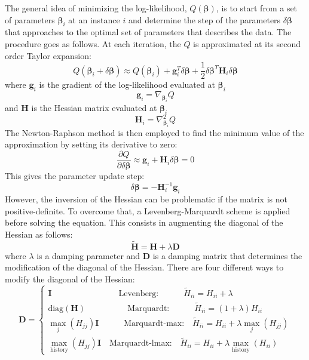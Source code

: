 The general idea of minimizing the log-likelihood, $Q(\boldsymbol{\beta})$, is to start from a set of parameters $\boldsymbol{\beta}_i$ at an instance $i$ and determine the 
step of the parameters $\delta \boldsymbol{\beta}$ that approaches to the optimal set of parameters that describes the data. 
The procedure goes as follows. At each iteration, the $Q$ is approximated at its second order Taylor expansion:
\begin{equation}
    Q( \boldsymbol{\beta}_i + \delta \boldsymbol{\beta} ) \approx 
    Q( \boldsymbol{\beta}_i) + \mathbf{g}_i^T \delta \boldsymbol{\beta} + \frac{1}{2} \delta \boldsymbol{\beta}^T \mathbf{H}_i \delta \boldsymbol{\beta}
\end{equation}
where $\mathbf{g}_i$ is the gradient of the log-likelihood evaluated at $\boldsymbol{\beta}_i$
\begin{equation}
    \mathbf{g}_i = \nabla_{\boldsymbol{\beta}_i} Q
\end{equation}
and $\mathbf{H}$ is the Hessian matrix evaluated at $\boldsymbol{\beta}_i$
\begin{equation}
    \mathbf{H}_i = \nabla_{\boldsymbol{\beta}_i}^2 Q
\end{equation}
The Newton-Raphson method is then employed to find the minimum value of the approximation by setting its derivative to zero:
\begin{equation}
    \frac{\partial Q}{\partial \delta \boldsymbol{\beta}} \approx \mathbf{g}_i + \mathbf{H}_i \delta \boldsymbol{\beta} = 0
\end{equation}
This gives the parameter update step:
\begin{equation}
    \delta \boldsymbol{\beta} = - \mathbf{H}_i^{-1} \mathbf{g}_i
\end{equation}
However, the inversion of the Hessian can be problematic if the matrix is not positive-definite. To overcome that, a Levenberg-Marquardt scheme is applied before 
solving the equation. This consists in augmenting the diagonal of the Hessian as follows:
\begin{equation}
    \tilde{\mathbf{H}} = \mathbf{H} + \lambda \mathbf{D}
\end{equation}
where $\lambda$ is a damping parameter and $\mathbf{D}$ is a damping matrix that determines the modification of the diagonal of the Hessian. There are four different ways to modify
the diagonal of the Hessian:
\begin{equation}
    \mathbf{D} = 
    \begin{cases}
        \mathbf{I} \qquad \qquad \qquad \qquad \text{Levenberg:} \quad \qquad \tilde{H}_{ii} = H_{ii} + \lambda \\
        \text{diag}(\mathbf{H} ) \qquad \qquad \quad \text{Marquardt:} \qquad \quad \tilde{H}_{ii} = (1+ \lambda) H_{ii} \\
        \max_j (H_{jj}) \mathbf{I} \qquad \quad \text{Marquardt-max:} \quad \tilde{H}_{ii} = H_{ii} + \lambda \max_j (H_{jj}) \\
        \max_{\text{history}} (H_{jj}) \mathbf{I} \quad \text{Marquardt-lmax:} \quad \tilde{H}_{ii} = H_{ii} + \lambda \max_{\text{history}} (H_{ii}) 
    \end{cases}
\end{equation}

